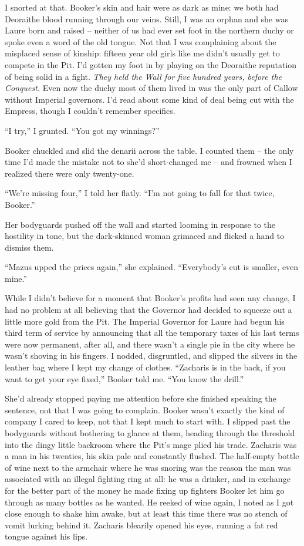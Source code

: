 \documentclass[12pt, openany]{book}
\begin{document}
I snorted at that. Booker’s skin and hair were as dark as mine: we both had Deoraithe blood running through our veins. Still, I was an orphan and she was Laure born and raised – neither of us had ever set foot in the northern duchy or spoke even a word of the old tongue. Not that I was complaining about the misplaced sense of kinship: fifteen year old girls like me didn’t usually get to compete in the Pit. I’d gotten my foot in by playing on the Deoraithe reputation of being solid in a fight. \textit{They held the Wall for five hundred years, before the Conquest.} Even now the duchy most of them lived in was the only part of Callow without Imperial governors. I’d read about some kind of deal being cut with the Empress, though I couldn’t remember specifics.

“I try,” I grunted. “You got my winnings?”

Booker chuckled and slid the denarii across the table. I counted them – the only time I’d made the mistake not to she’d short-changed me – and frowned when I realized there were only twenty-one.

“We’re missing four,” I told her flatly. “I’m not going to fall for that twice, Booker.”

Her bodyguards pushed off the wall and started looming in response to the hostility in tone, but the dark-skinned woman grimaced and flicked a hand to dismiss them.

“Mazus upped the prices again,” she explained. “Everybody’s cut is smaller, even mine.”

While I didn’t believe for a moment that Booker’s profits had seen any change, I had no problem at all believing that the Governor had decided to squeeze out a little more gold from the Pit. The Imperial Governor for Laure had begun his third term of service by announcing that all the temporary taxes of his last terms were now permanent, after all, and there wasn’t a single pie in the city where he wasn’t shoving in his fingers. I nodded, disgruntled, and slipped the silvers in the leather bag where I kept my change of clothes. “Zacharis is in the back, if you want to get your eye fixed,” Booker told me. “You know the drill.”

She’d already stopped paying me attention before she finished speaking the sentence, not that I was going to complain. Booker wasn’t exactly the kind of company I cared to keep, not that I kept much to start with. I slipped past the bodyguards without bothering to glance at them, heading through the threshold into the dingy little backroom where the Pit’s mage plied his trade. Zacharis was a man in his twenties, his skin pale and constantly flushed. The half-empty bottle of wine next to the armchair where he was snoring was the reason the man was associated with an illegal fighting ring at all: he was a drinker, and in exchange for the better part of the money he made fixing up fighters Booker let him go through as many bottles as he wanted. He reeked of wine again, I noted as I got close enough to shake him awake, but at least this time there was no stench of vomit lurking behind it. Zacharis blearily opened his eyes, running a fat red tongue against his lips. 
\end{document}
